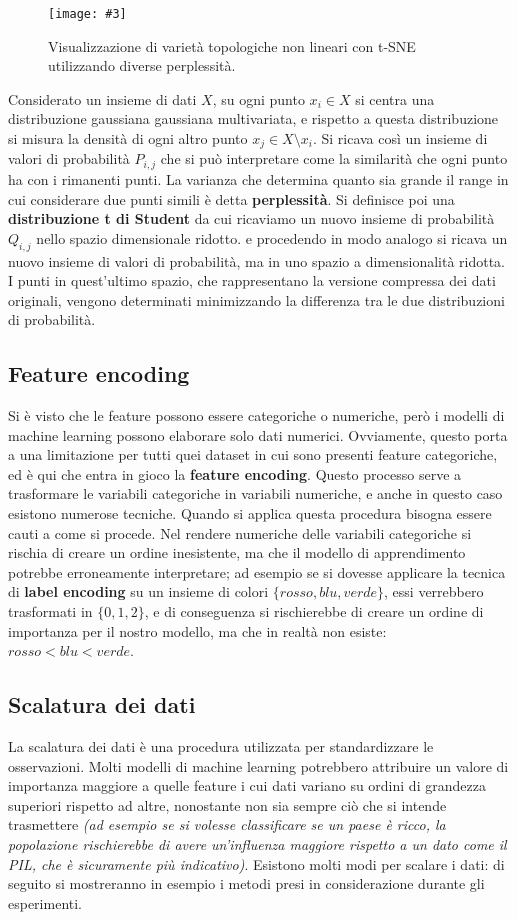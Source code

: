 \documentclass[12pt, twoside, letterpaper]{report}
\newcommand{\img}[4] {
	\begin{figure}
		\centering
		\texttt{[image: \#3]}\\
		\caption{#1}
		\label{fig:#4}
	\end{figure}
}
\begin{document}
					\img{Visualizzazione di varietà topologiche non lineari con t-SNE utilizzando diverse perplessità. \cite{sklearn}}{0.35}{tsne.png}{tsne}
				
					Considerato un insieme di dati $X$, su ogni punto $x_i \in X$ si centra una distribuzione gaussiana gaussiana multivariata, e rispetto a questa distribuzione si misura la densità di ogni altro punto $x_j \in X \setminus x_i$. Si ricava così un insieme di valori di probabilità $P_{i,j}$ che si può interpretare come la similarità che ogni punto ha con i rimanenti punti. La varianza che determina quanto sia grande il range in cui considerare due punti simili è detta \textbf{perplessità}. Si definisce poi una \textbf{distribuzione t di Student} da cui ricaviamo un nuovo insieme di probabilità $Q_{i,j}$ nello spazio dimensionale ridotto. e procedendo in modo analogo si ricava un nuovo insieme di valori di probabilità, ma in uno spazio a dimensionalità ridotta. I punti in quest'ultimo spazio, che rappresentano la versione compressa dei dati originali, vengono determinati minimizzando la differenza tra le due distribuzioni di probabilità.
					
			\subsection{Feature encoding} 
				Si è visto che le feature possono essere categoriche o numeriche, però i modelli di machine learning possono elaborare solo dati numerici. Ovviamente, questo porta a una limitazione per tutti quei dataset in cui sono presenti feature categoriche, ed è qui che entra in gioco la \textbf{feature encoding}. Questo processo serve a trasformare le variabili categoriche in variabili numeriche, e anche in questo caso esistono numerose tecniche. Quando si applica questa procedura bisogna essere cauti a come si procede. Nel rendere numeriche delle variabili categoriche si rischia di creare un ordine inesistente, ma che il modello di apprendimento potrebbe erroneamente interpretare; ad esempio se si dovesse applicare la tecnica di \textbf{label encoding} su un insieme di colori $\{rosso, blu, verde\}$, essi verrebbero trasformati in $\{0,1,2\}$, e di conseguenza si rischierebbe di creare un ordine di importanza per il nostro modello, ma che in realtà non esiste: $rosso < blu < verde$.
				
			\subsection{Scalatura dei dati} La scalatura dei dati è una procedura utilizzata per standardizzare le osservazioni. Molti modelli di machine learning potrebbero attribuire un valore di importanza maggiore a quelle feature i cui dati variano su ordini di grandezza superiori rispetto ad altre, nonostante non sia sempre ciò che si intende trasmettere \textit{(ad esempio se si volesse classificare se un paese è ricco, la popolazione rischierebbe di avere un'influenza maggiore rispetto a un dato come il PIL, che è sicuramente più indicativo)}. Esistono molti modi per scalare i dati: di seguito si mostreranno in esempio i metodi presi in considerazione durante gli esperimenti.
			
\end{document}
